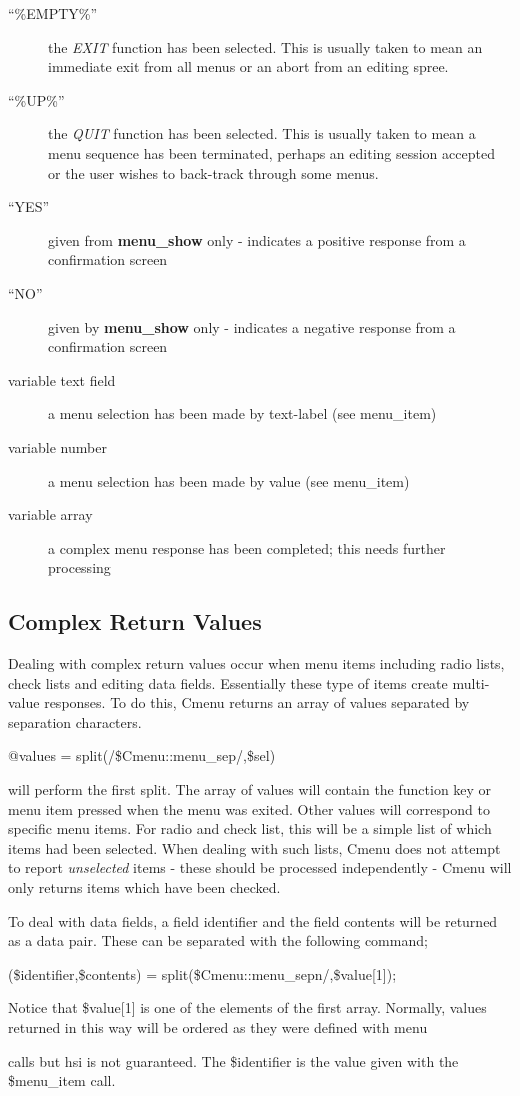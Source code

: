 \documentclass[a4paper,abstracton]{article}
\begin{document}
\begin{description}
\item [``\%EMPTY\%''] the \textit{EXIT} function has been selected. This is usually taken to mean an immediate exit from all menus or an abort from an editing spree.
\item [``\%UP\%''] the \textit{QUIT} function has been selected. This is usually taken to mean a menu sequence has been terminated, perhaps an editing session accepted or the user wishes to back-track through some menus.
\item [``YES''] given from \textbf{menu\_show} only - indicates a positive response from a confirmation screen
\item [``NO''] given by \textbf{menu\_show} only - indicates a negative response from a confirmation screen
\item [variable text field] a menu selection has been made by text-label (see menu\_item)
\item [variable number] a menu selection has been made by value (see menu\_item)
\item [variable array] a complex menu response has been completed; this needs further processing
\end{description}

\subsection{Complex Return Values}
Dealing with complex return values occur when menu items including radio lists, check lists and editing data fields. Essentially these type of items create multi-value responses. To do this, Cmenu returns an array of values separated by separation characters. 
\begin{center}
@values = split(/\$Cmenu::menu\_sep/,\$sel)
\end{center}
will perform the first split. The array of values will contain the function key or menu item pressed when the menu was exited. Other values will correspond to specific menu items. For radio and check list, this will be a simple list of which items had been selected. When dealing with such lists, Cmenu does not attempt to report \textit{unselected} items - these should be processed independently - Cmenu will only returns items which have been checked.

To deal with data fields, a field identifier and the field contents will be returned as a data pair. These can be separated with the following command;
\begin{center}
(\$identifier,\$contents) = split(\$Cmenu::menu\_sepn/,\$value[1]);
\end{center}
Notice that \$value[1] is one of the elements of the first array. Normally, values returned in this way will be ordered as they were defined with menu\item calls but hsi is not guaranteed. The \$identifier is the value given with the \$menu\_item call.
\end{document}
